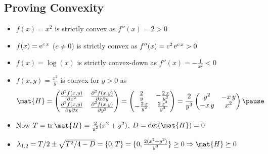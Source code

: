 
\begin{slide}
\section[-2]{Proving Convexity}

\begin{PauseHighLight}\squeeze
  \begin{itemize}
  \item $f(x)=x^2$ is strictly convex as $f''(x)=2>0$\pause
  \item $f(x)={\rm e}^{c\,x}$ ($c\neq0$) is strictly convex as $f''(x) =
    c^2\,{\rm e}^{c\,x}>0$\pause
  \item $f(x) = \log(x)$ is strictly convex-down
    as $f''(x)=-\frac{1}{x^2}<0$\pause
  \item $f(x,y) = \frac{x^2}{y}$ is convex for $y>0$ as
    \begin{align*}
      \mat{H} =
      \begin{pmatrix}
        \frac{\partial^2 f(x,y)}{\partial x^2}
        &
        \frac{\partial^2 f(x,y)}{\partial x \partial y}\\
        \frac{\partial^2 f(x,y)}{\partial y \partial x}
        &
        \frac{\partial^2 f(x,y)}{\partial y^2}
      \end{pmatrix}
      =
          \begin{pmatrix}
            \frac{2}{y}
            & -\frac{2\,x}{y^2} \\
            -\frac{2\,x}{y^2}
            & \frac{2\,x^2}{y^3}
          \end{pmatrix}
              = \frac{2}{y^3}
              \begin{pmatrix}
                y^2 & -x\,y \\
                -x\,y & x^2
              \end{pmatrix}\pause
    \end{align*}
  \item Now $T = \mathrm{tr}\, \mat{H} = \frac{2}{y^3}(x^2+y^2)$, $D =
    \det(\mat{H})=0$\pause
  \item $\lambda_{1,2} =T/2 \pm \sqrt{T^2/4-D} = \{0, T\} =
    \{0,\frac{2(x^2+y^2)}{y^3}\} \geq 0 \Rightarrow \mat{H}\succeq 0$\pause
  \end{itemize}
\end{PauseHighLight}

\end{slide}

